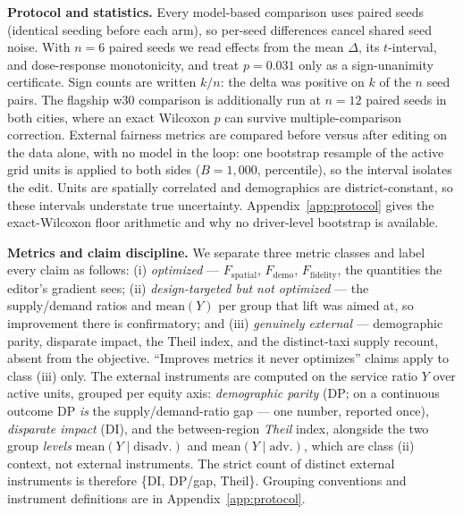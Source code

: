 \textbf{Protocol and statistics.} Every model-based comparison uses paired
seeds (identical seeding before each arm), so per-seed differences cancel
shared seed noise. With $n = 6$ paired seeds we read effects from the mean
$\Delta$, its $t$-interval, and dose-response monotonicity, and treat
$p = 0.031$ only as a sign-unanimity certificate. Sign counts are written
$k/n$: the delta was positive on $k$ of the $n$ seed pairs. The flagship w30 comparison
is additionally run at $n = 12$ paired seeds in both cities, where an exact
Wilcoxon $p$ can survive multiple-comparison correction.
External fairness metrics are compared before versus after editing on the data alone,
with no model in the loop: one bootstrap resample of the active grid units
is applied to both sides ($B = 1{,}000$, percentile), so the interval
isolates the edit. Units are spatially correlated and demographics are
district-constant, so these intervals understate true uncertainty. 
Appendix~\ref{app:protocol} gives the exact-Wilcoxon floor arithmetic and
why no driver-level bootstrap is available.

\textbf{Metrics and claim discipline.} We separate three metric classes and
label every claim as follows: (i) \emph{optimized} --- $F_{\mathrm{spatial}}$,
$F_{\mathrm{demo}}$, $F_{\mathrm{fidelity}}$, the quantities the editor's
gradient sees; (ii) \emph{design-targeted but not optimized} --- the
supply\slash demand ratios and $\mathrm{mean}(Y)$ per group that lift was
aimed at, so
improvement there is confirmatory; and (iii) \emph{genuinely external} ---
demographic parity, disparate impact, the Theil index, and the distinct-taxi
supply recount, absent from the objective.
``Improves metrics it never optimizes'' claims apply to class (iii) only. The
external instruments are computed on the service ratio $Y$ over active units,
grouped per equity axis: \emph{demographic parity} (DP; on a continuous outcome
DP \emph{is} the supply/demand-ratio gap --- one number, reported once),
\emph{disparate impact} (DI), and the between-region \emph{Theil} index,
alongside the two group \emph{levels} $\mathrm{mean}(Y \mid \mathrm{disadv.})$
and $\mathrm{mean}(Y \mid \mathrm{adv.})$, which are class (ii) context, not
external instruments. The strict count of distinct external instruments is
therefore \{DI, DP/gap, Theil\}.
Grouping conventions and instrument definitions are in
Appendix~\ref{app:protocol}.

